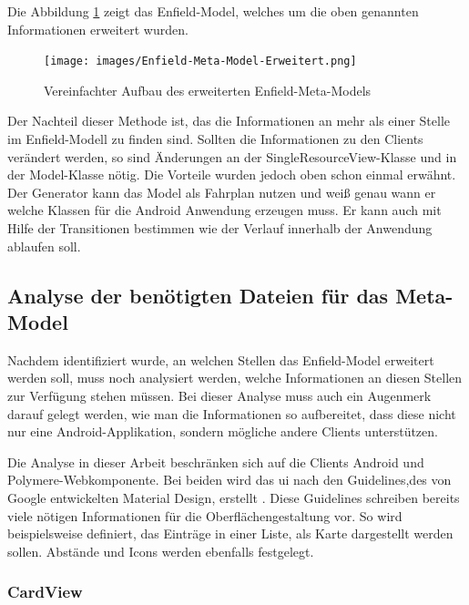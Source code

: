 Die Abbildung \ref{fig:enfield-model-extended} zeigt das Enfield-Model, welches um die oben genannten Informationen erweitert wurden.

\begin{figure}[H]
	\begin{center}
		\texttt{[image: images/Enfield-Meta-Model-Erweitert.png]}
		\caption{Vereinfachter Aufbau des erweiterten Enfield-Meta-Models}
		\label{fig:enfield-model-extended}
	\end{center}
\end{figure}

Der Nachteil dieser Methode ist, das die Informationen an mehr als einer Stelle im Enfield-Modell zu finden sind. Sollten die Informationen zu den Clients verändert werden, so sind Änderungen an der SingleResourceView-Klasse und in der Model-Klasse nötig. Die Vorteile wurden jedoch oben schon einmal erwähnt. Der Generator kann das Model als Fahrplan nutzen und weiß genau wann er welche Klassen für die Android Anwendung erzeugen muss. Er kann auch mit Hilfe der Transitionen bestimmen wie der Verlauf innerhalb der Anwendung ablaufen soll.

\newpage
\subsection{Analyse der benötigten Dateien für das Meta-Model}

Nachdem identifiziert wurde, an welchen Stellen das Enfield-Model erweitert werden soll, muss noch analysiert werden, welche Informationen an diesen Stellen zur Verfügung stehen müssen. Bei dieser Analyse muss auch ein Augenmerk darauf gelegt werden, wie man die Informationen so aufbereitet, dass diese nicht nur eine Android-Applikation, sondern mögliche andere Clients unterstützen.

Die Analyse in dieser Arbeit beschränken sich auf die Clients Android und Polymere-Webkomponente. Bei beiden wird das \acf{ui} nach den Guidelines,des von Google entwickelten Material Design, erstellt \cite{material}. Diese Guidelines schreiben bereits viele nötigen Informationen für die Oberflächengestaltung vor. So wird beispielsweise definiert, das Einträge in einer Liste, als Karte dargestellt werden sollen. Abstände und Icons werden ebenfalls festgelegt.

\subsubsection{CardView}

